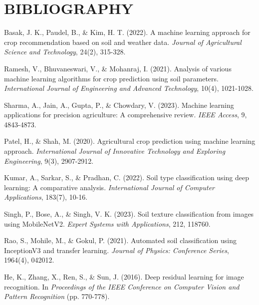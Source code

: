 \documentclass[12pt,a4paper]{report}
\begin{document}
\chapter*{BIBLIOGRAPHY}

\begin{enumerate}[leftmargin=*,label={[\arabic*]},itemsep=8pt]
\item Basak, J. K., Paudel, B., \& Kim, H. T. (2022). A machine learning approach for crop recommendation based on soil and weather data. \textit{Journal of Agricultural Science and Technology}, 24(2), 315-328.

\item Ramesh, V., Bhuvaneswari, V., \& Mohanraj, I. (2021). Analysis of various machine learning algorithms for crop prediction using soil parameters. \textit{International Journal of Engineering and Advanced Technology}, 10(4), 1021-1028.

\item Sharma, A., Jain, A., Gupta, P., \& Chowdary, V. (2023). Machine learning applications for precision agriculture: A comprehensive review. \textit{IEEE Access}, 9, 4843-4873.

\item Patel, H., \& Shah, M. (2020). Agricultural crop prediction using machine learning approach. \textit{International Journal of Innovative Technology and Exploring Engineering}, 9(3), 2907-2912.

\item Kumar, A., Sarkar, S., \& Pradhan, C. (2022). Soil type classification using deep learning: A comparative analysis. \textit{International Journal of Computer Applications}, 183(7), 10-16.

\item Singh, P., Bose, A., \& Singh, V. K. (2023). Soil texture classification from images using MobileNetV2. \textit{Expert Systems with Applications}, 212, 118760.

\item Rao, S., Mohile, M., \& Gokul, P. (2021). Automated soil classification using InceptionV3 and transfer learning. \textit{Journal of Physics: Conference Series}, 1964(4), 042012.

\item He, K., Zhang, X., Ren, S., \& Sun, J. (2016). Deep residual learning for image recognition. In \textit{Proceedings of the IEEE Conference on Computer Vision and Pattern Recognition} (pp. 770-778).


\end{enumerate}
\end{document}
